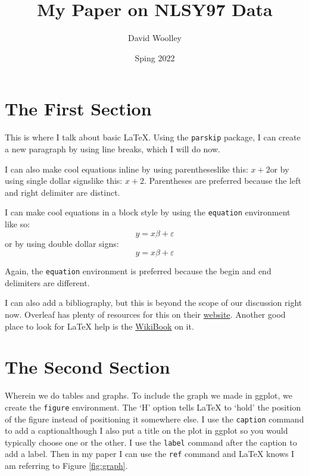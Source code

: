 \documentclass{article}
\author{David Woolley}
\title{My Paper on NLSY97 Data}
\date{Sping 2022}
\begin{document}
\maketitle

\section{The First Section}

This is where I talk about basic \LaTeX. Using the \texttt{parskip} package, I can create a new paragraph by using line breaks, which I will do now.

I can also make cool equations inline by using parentheses{\textemdash}like this: \(x + 2\){\textemdash}or by using single dollar signs{\textemdash}like this: $x+2$. Parentheses are preferred because the left and right delimiter are distinct.

I can make cool equations in a block style by using the \texttt{equation} environment like so:
\begin{equation*}
    y = x\beta + \varepsilon
\end{equation*}
or by using double dollar signs:
$$
    y = x\beta + \varepsilon
$$

Again, the \texttt{equation} environment is preferred because the begin and end delimiters are different.

I can also add a bibliography, but this is beyond the scope of our discussion right now. Overleaf has plenty of resources for this on their \href{https://www.overleaf.com/learn}{website}. Another good place to look for LaTeX help is the \href{https://en.wikibooks.org/wiki/LaTeX}{WikiBook} on it.

\newpage

\section{The Second Section}

Wherein we do tables and graphs. To include the graph we made in ggplot, we create the \texttt{figure} environment. The `H' option tells LaTeX to `hold' the position of the figure instead of positioning it somewhere else. I use the \texttt{caption} command to add a caption{\textemdash}although I also put a title on the plot in ggplot so you would typically choose one or the other. I use the \texttt{label} command after the caption to add a label. Then in my paper I can use the \texttt{ref} command and LaTeX knows I am referring to Figure \ref{fig:graph}.
\end{document}
